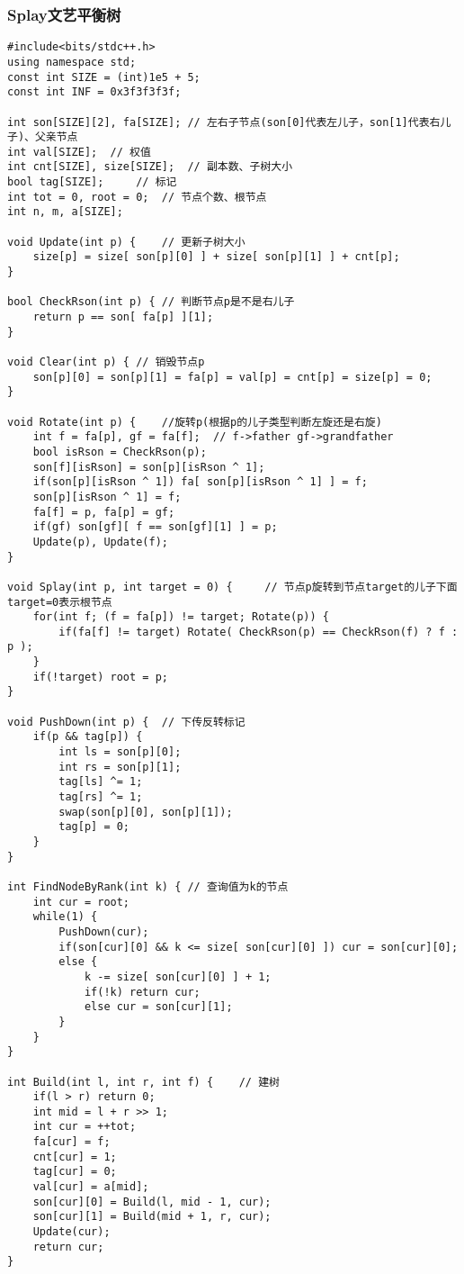 \subsubsection{Splay文艺平衡树}
\begin{lstlisting}
#include<bits/stdc++.h>
using namespace std;
const int SIZE = (int)1e5 + 5;
const int INF = 0x3f3f3f3f;

int son[SIZE][2], fa[SIZE];	// 左右子节点(son[0]代表左儿子，son[1]代表右儿子)、父亲节点
int val[SIZE];	// 权值 
int cnt[SIZE], size[SIZE];	// 副本数、子树大小 
bool tag[SIZE]; 	// 标记 
int tot = 0, root = 0;	// 节点个数、根节点 
int n, m, a[SIZE];

void Update(int p) {	// 更新子树大小 
	size[p] = size[ son[p][0] ] + size[ son[p][1] ] + cnt[p];
}

bool CheckRson(int p) {	// 判断节点p是不是右儿子 
	return p == son[ fa[p] ][1];
}

void Clear(int p) {	// 销毁节点p 
	son[p][0] = son[p][1] = fa[p] = val[p] = cnt[p] = size[p] = 0;
}

void Rotate(int p) {	//旋转p(根据p的儿子类型判断左旋还是右旋) 
	int f = fa[p], gf = fa[f];	// f->father gf->grandfather
	bool isRson = CheckRson(p);
	son[f][isRson] = son[p][isRson ^ 1];
	if(son[p][isRson ^ 1]) fa[ son[p][isRson ^ 1] ] = f;
	son[p][isRson ^ 1] = f;
	fa[f] = p, fa[p] = gf;
	if(gf) son[gf][ f == son[gf][1] ] = p;
	Update(p), Update(f);
}

void Splay(int p, int target = 0) { 	// 节点p旋转到节点target的儿子下面 target=0表示根节点 
	for(int f; (f = fa[p]) != target; Rotate(p)) {
		if(fa[f] != target) Rotate( CheckRson(p) == CheckRson(f) ? f : p );
	}
	if(!target) root = p;
}

void PushDown(int p) {	// 下传反转标记 
	if(p && tag[p]) {
		int ls = son[p][0];
		int rs = son[p][1];
		tag[ls] ^= 1;
		tag[rs] ^= 1;
		swap(son[p][0], son[p][1]);
		tag[p] = 0;
	}
}

int FindNodeByRank(int k) {	// 查询值为k的节点 
	int cur = root;
	while(1) {
		PushDown(cur);
		if(son[cur][0] && k <= size[ son[cur][0] ]) cur = son[cur][0];
		else {
			k -= size[ son[cur][0] ] + 1;
			if(!k) return cur;
			else cur = son[cur][1];
		}
	}
}

int Build(int l, int r, int f) {	// 建树 
	if(l > r) return 0;
	int mid = l + r >> 1;
	int cur = ++tot;
	fa[cur] = f;
	cnt[cur] = 1;
	tag[cur] = 0;
	val[cur] = a[mid];	
	son[cur][0] = Build(l, mid - 1, cur);
	son[cur][1] = Build(mid + 1, r, cur);
	Update(cur);
	return cur;
}


\end{lstlisting}
